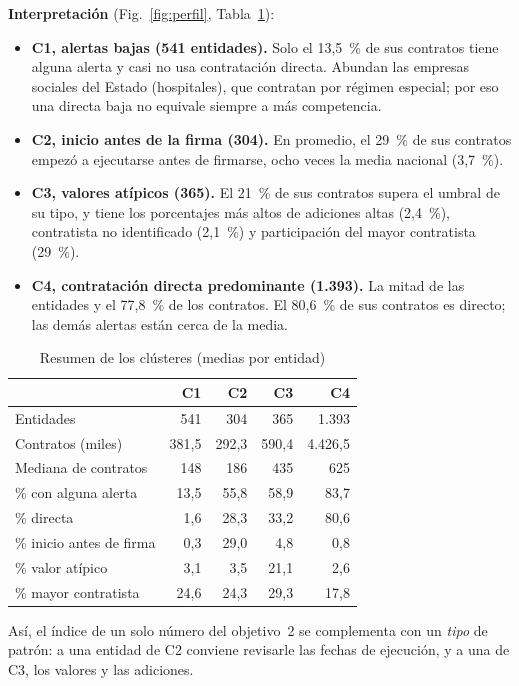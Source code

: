 \documentclass[conference,a4paper]{IEEEtran}
\begin{document}
\textbf{Interpretación} (Fig.~\ref{fig:perfil}, Tabla~\ref{tab:clusters}):
\begin{itemize}
  \item \textbf{C1, alertas bajas (541 entidades).} Solo el 13,5~\% de sus contratos tiene alguna alerta y casi
        no usa contratación directa. Abundan las empresas sociales del Estado (hospitales), que contratan por
        régimen especial; por eso una directa baja no equivale siempre a más competencia.
  \item \textbf{C2, inicio antes de la firma (304).} En promedio, el 29~\% de sus contratos empezó a ejecutarse
        antes de firmarse, ocho veces la media nacional (3,7~\%).
  \item \textbf{C3, valores atípicos (365).} El 21~\% de sus contratos supera el umbral de su tipo, y tiene los
        porcentajes más altos de adiciones altas (2,4~\%), contratista no identificado (2,1~\%) y participación
        del mayor contratista (29~\%).
  \item \textbf{C4, contratación directa predominante (1.393).} La mitad de las entidades y el 77,8~\% de los
        contratos. El 80,6~\% de sus contratos es directo; las demás alertas están cerca de la media.
\end{itemize}

\begin{table}[t]
\centering
\caption{Resumen de los clústeres (medias por entidad)}
\label{tab:clusters}
\footnotesize
\begin{tabular}{@{}lrrrr@{}}
\toprule
 & C1 & C2 & C3 & C4 \\
\midrule
Entidades & 541 & 304 & 365 & 1.393 \\
Contratos (miles) & 381,5 & 292,3 & 590,4 & 4.426,5 \\
Mediana de contratos & 148 & 186 & 435 & 625 \\
\% con alguna alerta & 13,5 & 55,8 & 58,9 & 83,7 \\
\% directa & 1,6 & 28,3 & 33,2 & 80,6 \\
\% inicio antes de firma & 0,3 & 29,0 & 4,8 & 0,8 \\
\% valor atípico & 3,1 & 3,5 & 21,1 & 2,6 \\
\% mayor contratista & 24,6 & 24,3 & 29,3 & 17,8 \\
\bottomrule
\end{tabular}
\end{table}

Así, el índice de un solo número del objetivo~2 se complementa con un \emph{tipo} de patrón: a una entidad de C2
conviene revisarle las fechas de ejecución, y a una de C3, los valores y las adiciones.
\end{document}
